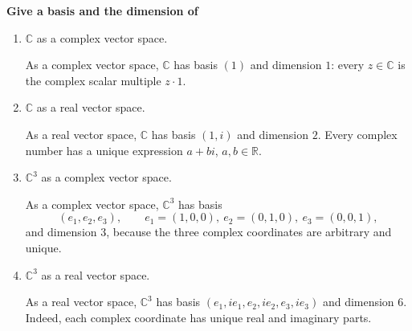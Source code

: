 \providecommand{\rank}{\operatorname{r}}
\providecommand{\RR}{\mathbb R}
\providecommand{\CC}{\mathbb C}
\providecommand{\KK}{\mathbb K}

\setcounter{enumi}{86}
\item {\bfseries\boldmath
Give a basis and the dimension of
}

\begin{enumerate}[label=\alph*)]

\item $\CC$ as a complex vector space.

\begin{answer}
As a complex vector space, $\CC$ has basis $(1)$ and dimension $1$:
every $z\in\CC$ is the complex scalar multiple $z\cdot1$.
\end{answer}

\item $\CC$ as a real vector space.

\begin{answer}
As a real vector space, $\CC$ has basis $(1,i)$ and dimension $2$.
Every complex number has a unique expression $a+bi$, $a,b\in\RR$.
\end{answer}

\item $\CC^3$ as a complex vector space.

\begin{answer}
As a complex vector space, $\CC^3$ has basis
\[
 (e_1,e_2,e_3),\qquad e_1=(1,0,0),\ e_2=(0,1,0),\ e_3=(0,0,1),
\]
and dimension $3$, because the three complex coordinates are arbitrary and unique.
\end{answer}

\item $\CC^3$ as a real vector space.

\begin{answer}
As a real vector space, $\CC^3$ has basis
$(e_1,ie_1,e_2,ie_2,e_3,ie_3)$ and dimension $6$.
Indeed, each complex coordinate has unique real and imaginary parts.
\end{answer}
\end{enumerate}
